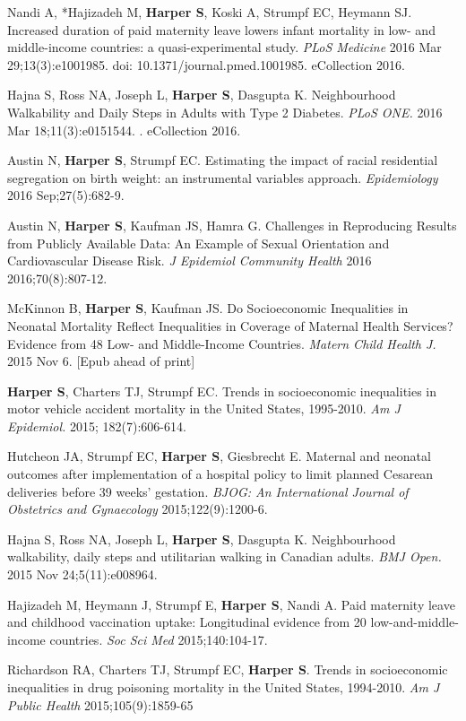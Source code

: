 \documentclass[
  letterpaper,
  DIV=11,
  numbers=noendperiod]{scrartcl}
\begin{document}
Nandi A, *Hajizadeh M, \textbf{Harper S}, Koski A, Strumpf EC, Heymann
SJ. Increased duration of paid maternity leave lowers infant mortality
in low- and middle-income countries: a quasi-experimental study.
\emph{PLoS Medicine} 2016 Mar 29;13(3):e1001985. doi:
10.1371/journal.pmed.1001985. eCollection 2016.

Hajna S, Ross NA, Joseph L, \textbf{Harper S}, Dasgupta K. Neighbourhood
Walkability and Daily Steps in Adults with Type 2 Diabetes. \emph{PLoS
ONE.} 2016 Mar 18;11(3):e0151544. . eCollection 2016.

Austin N, \textbf{Harper S}, Strumpf EC. Estimating the impact of racial
residential segregation on birth weight: an instrumental variables
approach. \emph{Epidemiology} 2016 Sep;27(5):682-9.

Austin N, \textbf{Harper S}, Kaufman JS, Hamra G. Challenges in
Reproducing Results from Publicly Available Data: An Example of Sexual
Orientation and Cardiovascular Disease Risk. \emph{J Epidemiol Community
Health} 2016 2016;70(8):807-12.

McKinnon B, \textbf{Harper S}, Kaufman JS. Do Socioeconomic Inequalities
in Neonatal Mortality Reflect Inequalities in Coverage of Maternal
Health Services? Evidence from 48 Low- and Middle-Income Countries.
\emph{Matern Child Health J.} 2015 Nov 6. {[}Epub ahead of print{]}

\textbf{Harper S}, Charters TJ, Strumpf EC. Trends in socioeconomic
inequalities in motor vehicle accident mortality in the United States,
1995-2010. \emph{Am J Epidemiol.} 2015; 182(7):606-614.

Hutcheon JA, Strumpf EC, \textbf{Harper S}, Giesbrecht E. Maternal and
neonatal outcomes after implementation of a hospital policy to limit
planned Cesarean deliveries before 39 weeks' gestation. \emph{BJOG: An
International Journal of Obstetrics and Gynaecology} 2015;122(9):1200-6.

Hajna S, Ross NA, Joseph L, \textbf{Harper S}, Dasgupta K. Neighbourhood
walkability, daily steps and utilitarian walking in Canadian adults.
\emph{BMJ Open.} 2015 Nov 24;5(11):e008964.

Hajizadeh M, Heymann J, Strumpf E, \textbf{Harper S}, Nandi A. Paid
maternity leave and childhood vaccination uptake: Longitudinal evidence
from 20 low-and-middle-income countries. \emph{Soc Sci Med}
2015;140:104-17.

Richardson RA, Charters TJ, Strumpf EC, \textbf{Harper S}. Trends in
socioeconomic inequalities in drug poisoning mortality in the United
States, 1994-2010. \emph{Am J Public Health} 2015;105(9):1859-65
\end{document}
